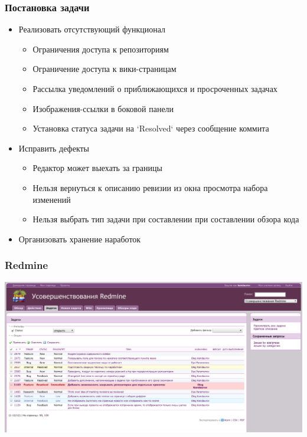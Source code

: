 \documentclass[unicode]{beamer}
\begin{document}
\begin{frame}
\transwipe[direction=90]
\frametitle{Постановка задачи}
\begin{block}{}
\begin{itemize}
  \item Реализовать отсутствующий функционал
  \begin{itemize}
    \item Ограничения доступа к репозиториям
    \item Ограничение доступа к вики-страницам
    \item Рассылка уведомлений о приближающихся и просроченных задачах
    \item Изображения-ссылки в боковой панели
    \item Установка статуса задачи на `Resolved` через сообщение коммита
  \end{itemize}
  \item Исправить дефекты
  \begin{itemize}
    \item Редактор может выехать за границы
    \item Нельзя вернуться к описанию ревизии из окна просмотра набора изменений
    \item Нельзя выбрать тип задачи при составлении при составлении обзора кода
  \end{itemize}
  \item Организовать хранение наработок
\end{itemize}
\end{block}
\end{frame}

\begin{frame}
\transwipe[direction=90]
\frametitle{Redmine}
\includegraphics[width=1\textwidth]{redmine-issues.png}
\end{frame}
\end{document}
